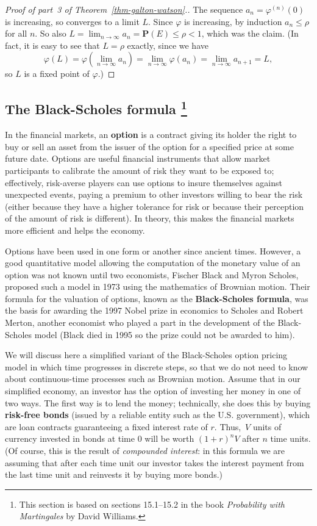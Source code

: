 \documentclass[12pt]{article}
\newcommand{\prob}{\mathbf{P}}
\theoremstyle{example}
\begin{document}
\begin{proof}[Proof of part~3 of Theorem~\ref{thm-galton-watson}.]
The sequence $a_n = \varphi^{(n)}(0)$ is increasing, so converges to a limit $L$. Since $\varphi$ is increasing, by induction $a_n\le \rho$ for all $n$. So also $L=\lim_{n\to\infty} a_n = \prob(E) \le \rho <1$, which was the claim. (In fact, it is easy to see that $L=\rho$ exactly, since we have
$$ \varphi(L)=\varphi(\lim_{n\to\infty} a_n) = \lim_{n\to\infty} \varphi(a_n) = \lim_{n\to\infty} a_{n+1} = L, $$
so $L$ is a fixed point of $\varphi$.)
\end{proof}


\subsection{The Black-Scholes formula \footnote{This section is based on sections 15.1--15.2 in the book \textit{Probability with Martingales} by David Williams.}}

In the financial markets, an \textbf{option} is a contract giving its holder the right to buy or sell an asset from the issuer of the option for a specified price at some future date. Options are useful financial instruments that allow market participants to calibrate the amount of risk they want to be exposed to; effectively, risk-averse players can use options to insure themselves against unexpected events, paying a premium to other investors willing to bear the risk (either because they have a higher tolerance for risk or because their perception of the amount of risk is different). In theory, this makes the financial markets more efficient and helps the economy.

Options have been used in one form or another since ancient times. However, a good quantitative model allowing the computation of the monetary value of an option was not known until two economists, Fischer Black and Myron Scholes, proposed such a model in 1973 using the mathematics of Brownian motion. Their formula for the valuation of options, known as the \textbf{Black-Scholes formula}, was the basis for awarding the 1997 Nobel prize in economics to Scholes and Robert Merton, another economist who played a part in the development of the Black-Scholes model (Black died in 1995 so the prize could not be awarded to him).

We will discuss here a simplified variant of the Black-Scholes option pricing model in which time progresses in discrete steps, so that we do not need to know about continuous-time processes such as Brownian motion. Assume that in our simplified economy, an investor has the option of investing her money in one of two ways. The first way is to lend the money; technically, she does this by buying \textbf{risk-free bonds} (issued by a reliable entity such as the U.S. government), which are loan contracts guaranteeing a fixed interest rate of $r$. Thus,~$V$ units of currency invested in bonds at time $0$ will be worth $(1+r)^n V$ after $n$ time units. (Of course, this is the result of \emph{compounded interest}: in this formula we are assuming that after each time unit our investor takes the interest payment from the last time unit and reinvests it by buying more bonds.)
\end{document}
